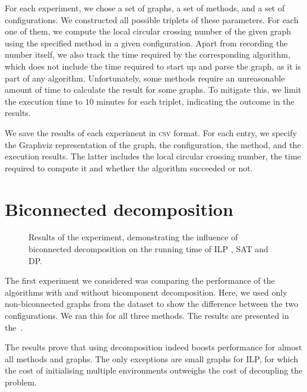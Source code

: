 For each experiment, we chose a set of graphs, a set of methods, and a set of configurations. We constructed all possible triplets of these parameters. For each one of them, we compute the local circular crossing number of the given graph using the specified method in a given configuration. Apart from recording the number itself, we also track the time required by the corresponding algorithm, which does not include the time required to start up and parse the graph, as it is part of any algorithm. Unfortunately, some methods require an unreasonable amount of time to calculate the result for some graphs. To mitigate this, we limit the execution time to \(10\) minutes for each triplet, indicating the outcome in the results.

We save the results of each experiment in \textsc{csv} format. For each entry, we specify the Graphviz representation of the graph, the configuration, the method, and the execution results. The latter includes the local circular crossing number, the time required to compute it and whether the algorithm succeeded or not.


\section{Biconnected decomposition}

\begin{figure}[tbh]
    \centering
     \hfill
     \hfill
    \caption{Results of the experiment, demonstrating the influence of biconnected decomposition on the running time of \textsf{ILP} , \textsf{SAT} and \textsf{DP}.}
    \label{fig:bctree-results}
\end{figure}

The first experiment we considered was comparing the performance of the algorithms with and without bicomponent decomposition. Here, we used only non-biconnected graphs from the dataset to show the difference between the two configurations. We ran this for all three methods. The results are presented in the~.

The results prove that using decomposition indeed boosts performance for almost all methods and graphs. The only exceptions are small graphs for \textsf{ILP}, for which the cost of initialising multiple environments outweighs the cost of decoupling the problem.


